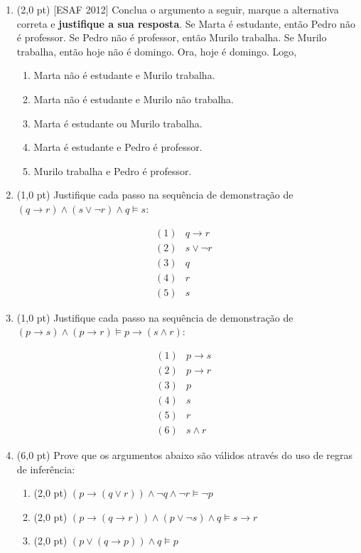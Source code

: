 \documentclass[11pt,a4paper,oneside]{article}
\begin{document}
\begin{enumerate}

	\item (2,0 pt) [ESAF 2012] Conclua o argumento a seguir, marque a alternativa correta e {\bf justifique a sua resposta}. Se Marta é estudante, então Pedro não é professor. Se Pedro não é professor, então Murilo trabalha. Se Murilo trabalha, então hoje não é domingo. Ora, hoje é domingo. Logo,
	
		\begin{enumerate}
			\item Marta não é estudante e Murilo trabalha.
			\item Marta não é estudante e Murilo não trabalha.
			\item Marta é estudante ou Murilo trabalha.
			\item Marta é estudante e Pedro é professor.
			\item Murilo trabalha e Pedro é professor.
		\end{enumerate}
	
	\item (1,0 pt) Justifique cada passo na sequência de demonstração de $(q \rightarrow r) \wedge (s \vee \neg r) \wedge q\models s$:
	
		\begin{eqnarray*}
			(1) & q \rightarrow r & \\
			(2) & s \vee \neg r & \\
			(3) & q & \\
			(4) & r & \\
			(5) & s &  
		\end{eqnarray*}	
	
	\item (1,0 pt) Justifique cada passo na sequência de demonstração de $(p \rightarrow s) \wedge (p \rightarrow r) \models p \rightarrow (s \wedge r)$:
	
		\begin{eqnarray*}
			(1) & p \rightarrow s & \\
			(2) & p \rightarrow r & \\
			(3) & p & \\
			(4) & s & \\
			(5) & r & \\
			(6) & s \wedge r & 
		\end{eqnarray*}	
		
	\item (6,0 pt) Prove que os argumentos abaixo são válidos através do uso de regras de inferência:
	
		\begin{enumerate}
			\item (2,0 pt) $(p \rightarrow (q \vee r)) \wedge \neg q \wedge \neg r \models \neg p$
			\item (2,0 pt) $(p \rightarrow (q \rightarrow r)) \wedge (p \vee \neg s) \wedge q \models s \rightarrow r$			
			\item (2,0 pt) $(p \vee (q \rightarrow p)) \wedge q \models p$
		\end{enumerate}
	
\end{enumerate}
\end{document}
